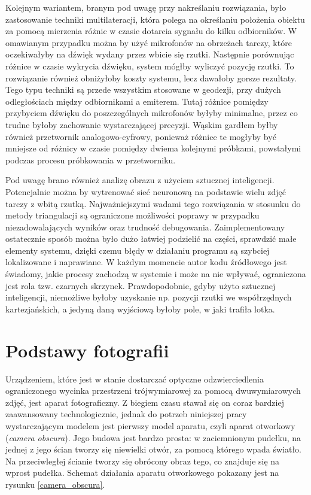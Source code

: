 Kolejnym wariantem, branym pod uwagę przy nakreślaniu rozwiązania, było zastosowanie techniki multilateracji, która polega na określaniu położenia obiektu za pomocą mierzenia różnic w czasie dotarcia sygnału do kilku odbiorników. W omawianym przypadku można by użyć mikrofonów na obrzeżach tarczy, które oczekiwałyby na dźwięk wydany przez wbicie się rzutki. Następnie porównując różnice w czasie wykrycia dźwięku, system mógłby wyliczyć pozycję rzutki. To rozwiązanie również obniżyłoby koszty systemu, lecz dawałoby gorsze rezultaty. Tego typu techniki są przede wszystkim stosowane w geodezji, przy dużych odległościach między odbiornikami a emiterem. Tutaj różnice pomiędzy przybyciem dźwięku do poszczególnych mikrofonów byłyby minimalne, przez co trudne byłoby zachowanie wystarczającej precyzji. Wąskim gardłem byłby również przetwornik analogowo-cyfrowy, ponieważ różnice te mogłyby być mniejsze od różnicy w czasie pomiędzy dwiema kolejnymi próbkami, powstałymi podczas procesu próbkowania w przetworniku.

Pod uwagę brano również analizę obrazu z użyciem sztucznej inteligencji. Potencjalnie można by wytrenować sieć neuronową na podstawie wielu zdjęć tarczy z wbitą rzutką. Najważniejszymi wadami tego rozwiązania w stosunku do metody triangulacji są ograniczone możliwości poprawy w przypadku niezadowalających wyników oraz trudność debugowania. Zaimplementowany ostatecznie sposób można było dużo łatwiej podzielić na części, sprawdzić małe elementy systemu, dzięki czemu błędy w działaniu programu są szybciej lokalizowane i naprawiane. W każdym momencie autor kodu źródłowego jest świadomy, jakie procesy zachodzą w systemie i może na nie wpływać, ograniczona jest rola tzw. czarnych skrzynek. Prawdopodobnie, gdyby użyto sztucznej inteligencji, niemożliwe byłoby uzyskanie np. pozycji rzutki we współrzędnych kartezjańskich, a jedyną daną wyjściową byłoby pole, w jaki trafiła lotka.

\section{Podstawy fotografii}
Urządzeniem, które jest w stanie dostarczać optyczne odzwierciedlenia ograniczonego wycinka przestrzeni trójwymiarowej za pomocą dwuwymiarowych zdjęć, jest aparat fotograficzny. Z biegiem czasu stawał się on coraz bardziej zaawansowany technologicznie, jednak do potrzeb niniejszej pracy wystarczającym modelem jest pierwszy model aparatu, czyli aparat otworkowy (\textit{camera obscura}). Jego budowa jest bardzo prosta: w zaciemnionym pudełku, na jednej z jego ścian tworzy się niewielki otwór, za pomocą którego wpada światło. Na przeciwległej ścianie tworzy się obrócony obraz tego, co znajduje się na wprost pudełka. Schemat działania aparatu otworkowego pokazany jest na rysunku \ref{camera_obscura}.

